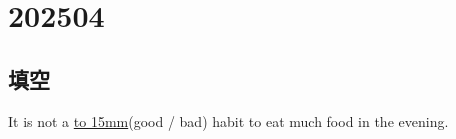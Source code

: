 \section{202504}

\subsection{填空}
\item{
    It is not a \underline{\hbox to 15mm{}}(good / bad) habit to eat much food in the evening.
    \\
}